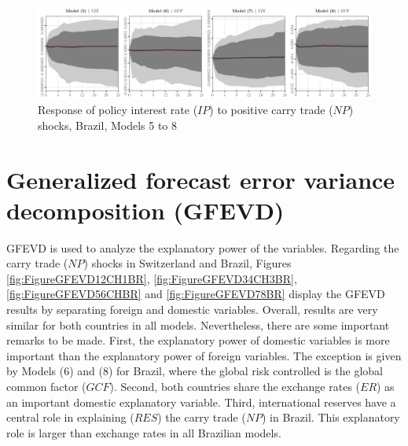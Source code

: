 \documentclass[a4paper, twoside]{templates/ociamthesis}
\begin{document}
\clearpage

\begin{figure}[!ht]

{\centering \includegraphics[width=0.99\columnwidth]{figure/g.MODEL5678.NPHIGHER.TARGET.IR.BR} 

}

\caption{Response of policy interest rate ($IP$) to positive carry trade ($NP$) shocks, Brazil, Models 5 to 8}\label{fig:FigureIRBR2}
\end{figure}

\clearpage

\hypertarget{appendixd5}{%
\section{Generalized forecast error variance decomposition (GFEVD)}\label{appendixd5}}

GFEVD is used to analyze the explanatory power of the variables. Regarding the carry trade (\(NP\)) shocks in Switzerland and Brazil, Figures \ref{fig:FigureGFEVD12CH1BR}, \ref{fig:FigureGFEVD34CH3BR}, \ref{fig:FigureGFEVD56CHBR} and \ref{fig:FigureGFEVD78BR} display the GFEVD results by separating foreign and domestic variables. Overall, results are very similar for both countries in all models. Nevertheless, there are some important remarks to be made. First, the explanatory power of domestic variables is more important than the explanatory power of foreign variables. The exception is given by Models (6) and (8) for Brazil, where the global risk controlled is the global common factor (\(GCF\)). Second, both countries share the exchange rates (\(ER\)) as an important domestic explanatory variable. Third, international reserves have a central role in explaining (\(RES\)) the carry trade (\(NP\)) in Brazil. This explanatory role is larger than exchange rates in all Brazilian models.
\end{document}
